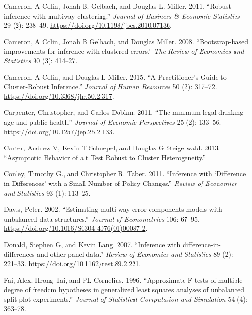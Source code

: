 \documentclass[12pt]{article}
\newlength{\cslhangindent}
\newlength{\cslentryspacingunit} %
\newenvironment{CSLReferences}[2] %
 {%
  \setlength{\parindent}{0pt}
  \ifodd #1
  \let\oldpar\par
  \def\par{\hangindent=\cslhangindent\oldpar}
  \fi
  \setlength{\parskip}{#2\cslentryspacingunit}
 }%
 {}
\begin{document}
\begin{CSLReferences}{1}{0}
\leavevmode{}%
Cameron, A Colin, Jonah B. Gelbach, and Douglas L. Miller. 2011.
{``{Robust inference with multiway clustering}.''} \emph{Journal of
Business {\&} Economic Statistics} 29 (2): 238--49.
\url{https://doi.org/10.1198/jbes.2010.07136}.

\leavevmode{}%
Cameron, A Colin, Jonah B Gelbach, and Douglas Miller. 2008.
{``{Bootstrap-based improvements for inference with clustered
errors}.''} \emph{The Review of Economics and Statistics} 90 (3):
414--27.

\leavevmode{}%
Cameron, A Colin, and Douglas L Miller. 2015. {``{A Practitioner's Guide
to Cluster-Robust Inference}.''} \emph{Journal of Human Resources} 50
(2): 317--72. \url{https://doi.org/10.3368/jhr.50.2.317}.

\leavevmode{}%
Carpenter, Christopher, and Carlos Dobkin. 2011. {``{The minimum legal
drinking age and public health}.''} \emph{Journal of Economic
Perspectives} 25 (2): 133--56.
\url{https://doi.org/10.1257/jep.25.2.133}.

\leavevmode{}%
Carter, Andrew V, Kevin T Schnepel, and Douglas G Steigerwald. 2013.
{``{Asymptotic Behavior of a t Test Robust to Cluster Heterogeneity}.''}

\leavevmode{}%
Conley, Timothy G., and Christopher R. Taber. 2011. {``{Inference with
{`Difference in Differences'} with a Small Number of Policy Changes}.''}
\emph{Review of Economics and Statistics} 93 (1): 113--25.

\leavevmode{}%
Davis, Peter. 2002. {``{Estimating multi-way error components models
with unbalanced data structures}.''} \emph{Journal of Econometrics} 106:
67--95. \url{https://doi.org/10.1016/S0304-4076(01)00087-2}.

\leavevmode{}%
Donald, Stephen G, and Kevin Lang. 2007. {``{Inference with
difference-in-differences and other panel data}.''} \emph{Review of
Economics and Statistics} 89 (2): 221--33.
\url{https://doi.org/10.1162/rest.89.2.221}.

\leavevmode{}%
Fai, Alex. Hrong-Tai, and PL Cornelius. 1996. {``{Approximate F-tests of
multiple degree of freedom hypotheses in generalized least squares
analyses of unbalanced split-plot experiments}.''} \emph{Journal of
Statistical Computation and Simulation} 54 (4): 363--78.


\end{CSLReferences}
\end{document}
